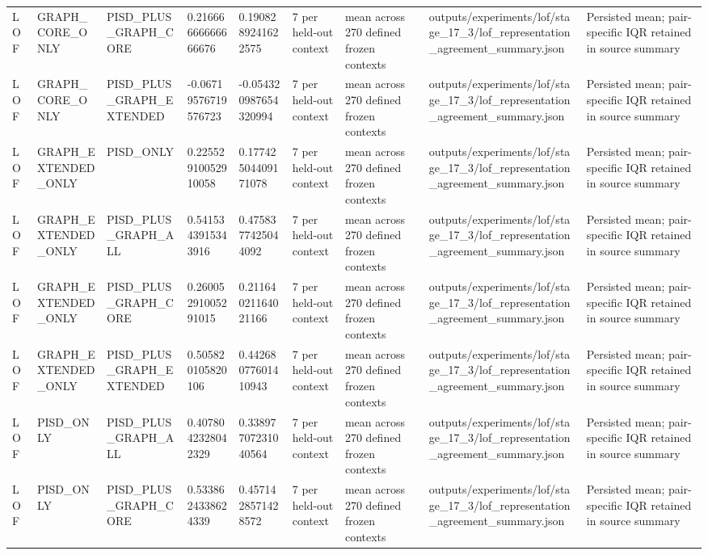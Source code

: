 \begin{longtable}{lllllllll}
LOF & GRAPH\_CORE\_ONLY & PISD\_PLUS\_GRAPH\_CORE & 0.21666666666666676 & 0.1908289241622575 & 7 per held-out context & mean across 270 defined frozen contexts & outputs/experiments/lof/stage\_17\_3/lof\_representation\_agreement\_summary.json & Persisted mean; pair-specific IQR retained in source summary \\
LOF & GRAPH\_CORE\_ONLY & PISD\_PLUS\_GRAPH\_EXTENDED & -0.06719576719576723 & -0.054320987654320994 & 7 per held-out context & mean across 270 defined frozen contexts & outputs/experiments/lof/stage\_17\_3/lof\_representation\_agreement\_summary.json & Persisted mean; pair-specific IQR retained in source summary \\
LOF & GRAPH\_EXTENDED\_ONLY & PISD\_ONLY & 0.22552910052910058 & 0.17742504409171078 & 7 per held-out context & mean across 270 defined frozen contexts & outputs/experiments/lof/stage\_17\_3/lof\_representation\_agreement\_summary.json & Persisted mean; pair-specific IQR retained in source summary \\
LOF & GRAPH\_EXTENDED\_ONLY & PISD\_PLUS\_GRAPH\_ALL & 0.5415343915343916 & 0.4758377425044092 & 7 per held-out context & mean across 270 defined frozen contexts & outputs/experiments/lof/stage\_17\_3/lof\_representation\_agreement\_summary.json & Persisted mean; pair-specific IQR retained in source summary \\
LOF & GRAPH\_EXTENDED\_ONLY & PISD\_PLUS\_GRAPH\_CORE & 0.26005291005291015 & 0.21164021164021166 & 7 per held-out context & mean across 270 defined frozen contexts & outputs/experiments/lof/stage\_17\_3/lof\_representation\_agreement\_summary.json & Persisted mean; pair-specific IQR retained in source summary \\
LOF & GRAPH\_EXTENDED\_ONLY & PISD\_PLUS\_GRAPH\_EXTENDED & 0.505820105820106 & 0.44268077601410943 & 7 per held-out context & mean across 270 defined frozen contexts & outputs/experiments/lof/stage\_17\_3/lof\_representation\_agreement\_summary.json & Persisted mean; pair-specific IQR retained in source summary \\
LOF & PISD\_ONLY & PISD\_PLUS\_GRAPH\_ALL & 0.4078042328042329 & 0.33897707231040564 & 7 per held-out context & mean across 270 defined frozen contexts & outputs/experiments/lof/stage\_17\_3/lof\_representation\_agreement\_summary.json & Persisted mean; pair-specific IQR retained in source summary \\
LOF & PISD\_ONLY & PISD\_PLUS\_GRAPH\_CORE & 0.5338624338624339 & 0.4571428571428572 & 7 per held-out context & mean across 270 defined frozen contexts & outputs/experiments/lof/stage\_17\_3/lof\_representation\_agreement\_summary.json & Persisted mean; pair-specific IQR retained in source summary \\

\end{longtable}
